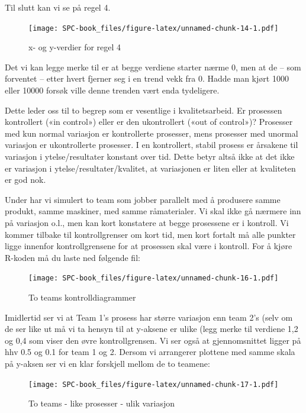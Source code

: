 \documentclass[
]{book}
\begin{document}
Til slutt kan vi se på regel 4.

\begin{figure}
\centering
\texttt{[image: SPC-book\_files/figure-latex/unnamed-chunk-14-1.pdf]}
\caption{\label{fig:unnamed-chunk-14}x- og y-verdier for regel 4}
\end{figure}

Det vi kan legge merke til er at begge verdiene starter nærme 0, men at de -- som forventet -- etter hvert fjerner seg i en trend vekk fra 0. Hadde man kjørt 1000 eller 10000 forsøk ville denne trenden vært enda tydeligere.

Dette leder oss til to begrep som er vesentlige i kvalitetsarbeid. Er prosessen kontrollert («in control») eller er den ukontrollert («out of control»)? Prosesser med kun normal variasjon er kontrollerte prosesser, mens prosesser med unormal variasjon er ukontrollerte prosesser. I en kontrollert, stabil prosess er årsakene til variasjon i ytelse/resultater konstant over tid. Dette betyr altså ikke at det ikke er variasjon i ytelse/resultater/kvalitet, at variasjonen er liten eller at kvaliteten er god nok.

Under har vi simulert to team som jobber parallelt med å produsere samme produkt, samme maskiner, med samme råmaterialer. Vi skal ikke gå nærmere inn på variasjon o.l., men kan kort konstatere at begge prosessene er i kontroll. Vi kommer tilbake til kontrollgrenser om kort tid, men kort fortalt må alle punkter ligge innenfor kontrollgrensene for at prosessen skal være i kontroll. For å kjøre R-koden må du laste ned følgende fil:

\begin{figure}
\centering
\texttt{[image: SPC-book\_files/figure-latex/unnamed-chunk-16-1.pdf]}
\caption{\label{fig:unnamed-chunk-16}To teams kontrolldiagrammer}
\end{figure}

Imidlertid ser vi at Team 1's prosess har større variasjon enn team 2's (selv om de ser like ut må vi ta hensyn til at y-aksene er ulike (legg merke til verdiene 1,2 og 0,4 som viser den øvre kontrollgrensen. Vi ser også at gjennomsnittet ligger på hhv 0.5 og 0.1 for team 1 og 2. Dersom vi arrangerer plottene med samme skala på y-aksen ser vi en klar forskjell mellom de to teamene:

\begin{figure}
\centering
\texttt{[image: SPC-book\_files/figure-latex/unnamed-chunk-17-1.pdf]}
\caption{\label{fig:unnamed-chunk-17}To teams - like prosesser - ulik variasjon}
\end{figure}
\end{document}
